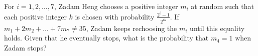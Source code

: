 For $i=1,2,\dots,7$, Zadam Heng chooses a positive integer $m_i$ at random such that each positive integer $k$ is chosen with probability $\frac{2^i-1}{2^{ik}}$. If $m_1+2m_2+\dots+7m_7\neq35$, Zadam keeps rechoosing the $m_i$ until this equality holds. Given that he eventually stops, what is the probability that $m_4=1$ when Zadam stops?
